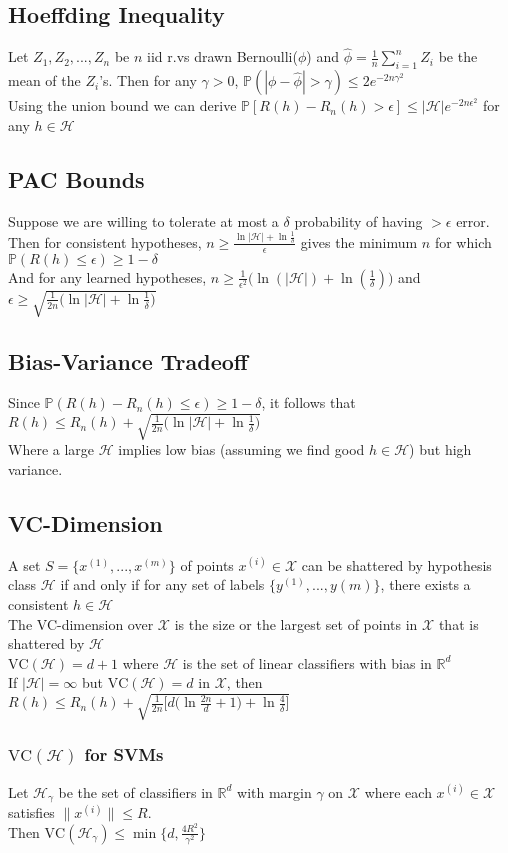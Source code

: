 \documentclass{article}
\renewcommand{\P}{\mathbb{P}}
\renewcommand{\H}{\mathcal{H}}
\newcommand{\X}{\mathcal{X}}
\newcommand{\R}{\mathbb{R}}
\begin{document}
\subsection{Hoeffding Inequality}
Let $Z_1, Z_2, ..., Z_n$ be $n$ iid r.vs drawn Bernoulli($\phi$) and $\hat{\phi} = \frac{1}{n}\sum_{i=1}^n Z_i$ be the mean of the $Z_i$'s. Then for any $\gamma > 0$, $\P(|\phi - \hat{\phi}| > \gamma) \leq 2e^{-2n\gamma^2}$ \\
Using the union bound we can derive $\P[R(h) - R_n(h) > \epsilon] \leq |\H| e^{-2n\epsilon^2}$ for any $h \in \H$
\subsection{PAC Bounds}
Suppose we are willing to tolerate at most a $\delta$ probability of having $> \epsilon$ error. \\ 
Then for consistent hypotheses, $n \geq \frac{\ln |\H| + \ln \frac{1}{\delta}}{\epsilon}$ gives the minimum $n$ for which $\P(R(h) \leq \epsilon) \geq 1 - \delta$ \\
And for any learned hypotheses, $n \geq \frac{1}{\epsilon^2}\big(\ln(|\H|) + \ln(\frac{1}{\delta}) \big)$ and $\epsilon \geq \sqrt{\frac{1}{2n} \big(\ln |\H| + \ln \frac{1}{\delta} \big)}$
\subsection{Bias-Variance Tradeoff}
Since $\P(R(h) - R_n(h) \leq \epsilon) \geq 1 - \delta$, it follows that $R(h) \leq R_n(h) +\sqrt{\frac{1}{2n} \big(\ln |\H| + \ln \frac{1}{\delta} \big)}$ \\
Where a large $\H$ implies low bias (assuming we find good $h \in \H$) but high variance.
\subsection{VC-Dimension}
A set $S = \{x^{(1)}, ..., x^{(m)}\}$ of points $x^{(i)} \in \X$ can be shattered by hypothesis class $\H$ if and only if for any set of labels $\{y^{(1)}, ..., y{(m)} \}$, there exists a consistent $h \in \H$ \\
The VC-dimension over $\X$ is the size or the largest set of points in $\X$ that is shattered by $\H$ \\
$\mbox{VC}(\H) = d + 1$ where $\H$ is the set of linear classifiers with bias in $\R^d$ \\
If $|\H| = \infty$ but $\mbox{VC}(\H) = d$ in $\X$, then $R(h) \leq R_n(h) +\sqrt{\frac{1}{2n} \big[d \big(\ln \frac{2n}{d} + 1\big) + \ln \frac{4}{\delta} \big]}$ 
\subsubsection{$\mbox{VC}(\H)$ for SVMs}
Let $\H_\gamma$ be the set of classifiers in $\R^d$ with margin $\gamma$ on $\X$ where each $x^{(i)} \in \X$ satisfies $\lVert x^{(i)} \rVert \leq R$. \\
Then $\mbox{VC}(\H_\gamma) \leq \min \Big\{d, \frac{4R^2}{\gamma^2} \Big\}$
\end{document}
